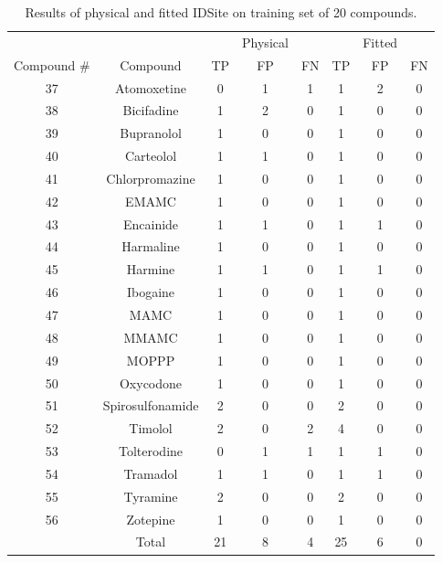 \begin{table}[h]
\singlespace
\footnotesize
\centering
\begin{tabular}{cccccccc}
\hline
 &  &  & Physical &  &  & Fitted & \\
Compound \# & Compound & TP & FP & FN & TP & FP & FN \\
\hline
37 & Atomoxetine & 0 & 1 & 1 & 1 & 2 & 0 \\
38 & Bicifadine & 1 & 2 & 0 & 1 & 0 & 0 \\
39 & Bupranolol & 1 & 0 & 0 & 1 & 0 & 0 \\
40 & Carteolol & 1 & 1 & 0 & 1 & 0 & 0 \\
41 & Chlorpromazine & 1 & 0 & 0 & 1 & 0 & 0 \\
42 & EMAMC & 1 & 0 & 0 & 1 & 0 & 0 \\
43 & Encainide & 1 & 1 & 0 & 1 & 1 & 0 \\
44 & Harmaline & 1 & 0 & 0 & 1 & 0 & 0 \\
45 & Harmine & 1 & 1 & 0 & 1 & 1 & 0 \\
46 & Ibogaine & 1 & 0 & 0 & 1 & 0 & 0 \\
47 & MAMC & 1 & 0 & 0 & 1 & 0 & 0 \\
48 & MMAMC & 1 & 0 & 0 & 1 & 0 & 0 \\
49 & MOPPP & 1 & 0 & 0 & 1 & 0 & 0 \\
50 & Oxycodone & 1 & 0 & 0 & 1 & 0 & 0 \\
51 & Spirosulfonamide & 2 & 0 & 0 & 2 & 0 & 0 \\
52 & Timolol & 2 & 0 & 2 & 4 & 0 & 0 \\
53 & Tolterodine & 0 & 1 & 1 & 1 & 1 & 0 \\
54 & Tramadol & 1 & 1 & 0 & 1 & 1 & 0 \\
55 & Tyramine & 2 & 0 & 0 & 2 & 0 & 0 \\
56 & Zotepine & 1 & 0 & 0 & 1 & 0 & 0 \\
 & Total & 21 & 8 & 4 & 25 & 6 & 0 \\
\hline
\end{tabular}
\caption{Results of physical and fitted IDSite on training set of 20 compounds.}
\label{table:p450_testing}
\end{table}





